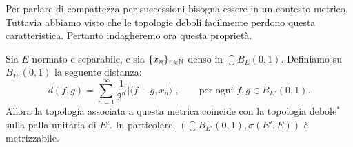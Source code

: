 Per parlare di compattezza per successioni bisogna essere in un contesto metrico. Tuttavia abbiamo visto che le topologie deboli facilmente perdono questa caratteristica. Pertanto indagheremo ora questa proprietà.

\begin{theorem}
\label{th:weaktop_fourteen}
	Sia $E$ normato e separabile, e sia $\{x_n\}_{n \in \mathbb{N}}$ denso in $\closure B_E(0,1)$.
	Definiamo su $B_{E'}(0,1)$ la seguente distanza:
	\begin{equation*}
		d(f,g) = \sum_{n=1}^\infty \frac1{2^n} |\langle f-g, x_n\rangle|, \qquad \text{per ogni $f,g \in B_{E'}(0,1)$}.
	\end{equation*}
	Allora la topologia associata a questa metrica coincide con la topologia debole$^*$ sulla palla unitaria di $E'$.
	In particolare, $(\closure B_{E'}(0,1), \sigma(E',E))$ è metrizzabile.
\end{theorem}
